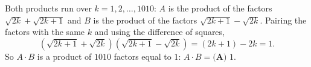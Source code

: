 Both products run over $k=1,2,\dots,1010$: $A$ is the product of the factors $\sqrt{2k}+\sqrt{2k+1}$ and $B$ is the product of the factors $\sqrt{2k+1}-\sqrt{2k}$. Pairing the factors with the same $k$ and using the difference of squares,
\[\left(\sqrt{2k+1}+\sqrt{2k}\right)\left(\sqrt{2k+1}-\sqrt{2k}\right)=(2k+1)-2k=1.\]
So $A\cdot B$ is a product of $1010$ factors equal to $1$: $A\cdot B=\boxed{\textbf{(A) }1}$.
